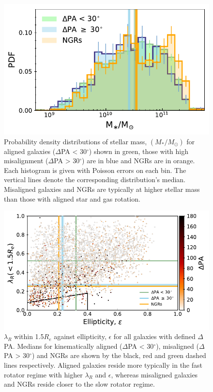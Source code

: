 \documentclass[fleqn,usenatbib]{mnras}
\begin{document}
\begin{figure}
	\includegraphics[width=\linewidth]{total_pop/delPA_stelM.pdf}
    \caption{Probability density distributions of stellar mass, $(M_{\ast}/M_{\odot})$ for aligned galaxies ($\Delta$PA < 30$^{\circ}$) shown in green, those with high misalignment ($\Delta$PA > 30$^{\circ}$) are in blue and NGRs are in orange. Each histogram is given with Poisson errors on each bin. The vertical lines denote the corresponding distribution's median. Misaligned galaxies and NGRs are typically at higher stellar mass than those with aligned star and gas rotation.}
    \label{fig:delPA_stelM}
\end{figure}

\begin{figure}
	\includegraphics[width=\linewidth]{total_pop/delPA_lambda_Re.pdf}
    \caption{$\lambda_R$ within 1.5$R_e$ against ellipticity, $\epsilon$ for all galaxies with defined $\Delta$PA. Medians for kinematically aligned ($\Delta$PA < 30$^{\circ}$), misaligned ($\Delta$PA > 30$^{\circ}$) and NGRs are shown by the black, red and green dashed lines respectively. Aligned galaxies reside more typically in the fast rotator regime with higher $\lambda_R$ and $\epsilon$, whereas misaligned galaxies and NGRs reside closer to the slow rotator regime.}
    \label{fig:delPA_lambda_Re}
\end{figure}
\end{document}
